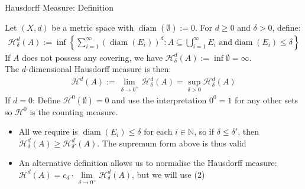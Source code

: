 \documentclass{beamer}
\DeclareMathOperator{\diam}{diam}
\begin{document}
\begin{frame}{Hausdorff Measure: Definition}
\scriptsize{
    \begin{definition}
        Let $(X, d)$ be a metric space with $\diam (\emptyset) :=0$. For $d \geq 0$ and $\delta > 0$, define:
        \begin{align}
            \mathcal{H}_\delta^d(A) := \inf\left\{\sum \limits _{i =1}^\infty (\diam (E_i))^d : A \subseteq \bigcup \limits _{i=1}^\infty E_i \text { and} \diam(E_i) \le \delta \right\}
        \end{align}
        If $A$ does not possess any covering, we have $\mathcal{H}_\delta ^d(A) := \inf \emptyset =\infty $.
        \\ The $d$-dimensional Hausdorff measure is then:
        \begin{align}
            \mathcal{H}^d(A) := \lim_{\ \delta \to 0^+} \mathcal{H}_\delta^d(A) = \sup_{\delta > 0} \mathcal{H}_\delta^d(A)
        \end{align}
         If $ d=0$: Define $\mathcal{H}^0(\emptyset)=0$ and use the interpretation $0^0=1$ for any other sets so $\mathcal{H}^0$ is the counting measure. 
    \end{definition}
    }
    \begin{itemize}
        \item All we require is $\diam (E_i) \le \delta $ for each $i \in \mathbb{N}$, so if $\delta \le \delta'$, then $ \mathcal{H}_\delta ^d(A) \ge \mathcal{H}_{\delta'}^d(A) $. The supremum form above is thus valid
        \item An alternative definition allows us to normalise the Hausdorff measure: $\mathcal{H}^d(A) = c_d \cdot \lim \limits _{\ \delta \to 0^+} \mathcal{H}_\delta^d(A)$, but we will use (2)
        
        
    \end{itemize}
\end{frame}
\end{document}
